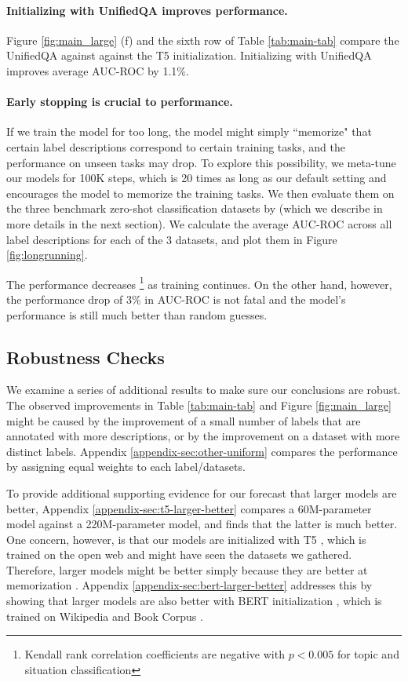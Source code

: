 \paragraph{Initializing with UnifiedQA improves performance.} Figure \ref{fig:main_large} (f) and the sixth row of Table \ref{tab:main-tab} compare the UnifiedQA against against the T5 initialization. Initializing with UnifiedQA improves average AUC-ROC by 1.1\%.

\paragraph{Early stopping is crucial to performance.} If we train the model for too long, the model might simply ``memorize" that certain label descriptions correspond to certain training tasks, and the performance on unseen tasks may drop. To explore this possibility, we meta-tune our models for 100K steps, which is 20 times as long as our default setting and encourages the model to memorize the training tasks. We then evaluate them on the three benchmark zero-shot classification datasets by \citet{yin-etal-2019-benchmarking} (which we describe in more details in the next section). We calculate the average AUC-ROC across all label descriptions for each of the 3 datasets, and plot them in Figure \ref{fig:longrunning}.

The performance decreases \footnote{Kendall rank correlation coefficients are negative with $p < 0.005$ for topic and situation classification} as training continues. On the other hand, however, the performance drop of 3\% in AUC-ROC is not fatal and the model's performance is still much better than random guesses.

\subsection{Robustness Checks} \label{sec:robust}
We examine a series of additional results to make sure our conclusions are robust. The observed improvements in Table \ref{tab:main-tab} and Figure \ref{fig:main_large} might be caused by the improvement of a small number of labels that are annotated with more descriptions, or by the improvement on a dataset with more distinct labels. Appendix \ref{appendix-sec:other-uniform} compares the performance by assigning equal weights to each label/datasets.

To provide additional supporting evidence for our forecast that larger models are better, Appendix \ref{appendix-sec:t5-larger-better} compares a 60M-parameter model against a 220M-parameter model, and finds that the latter is much better. One concern, however, is that our models are initialized with T5 \cite{raffel2019exploring}, which is trained on the open web and might have seen the datasets we gathered. Therefore, larger models might be better simply because they are better at memorization \cite{sagawa2020investigation}. Appendix \ref{appendix-sec:bert-larger-better} addresses this by showing that larger models are also better with BERT initialization \cite{devlin-etal-2019-bert}, which is trained on Wikipedia and Book Corpus \cite{zhu2015aligning}.

